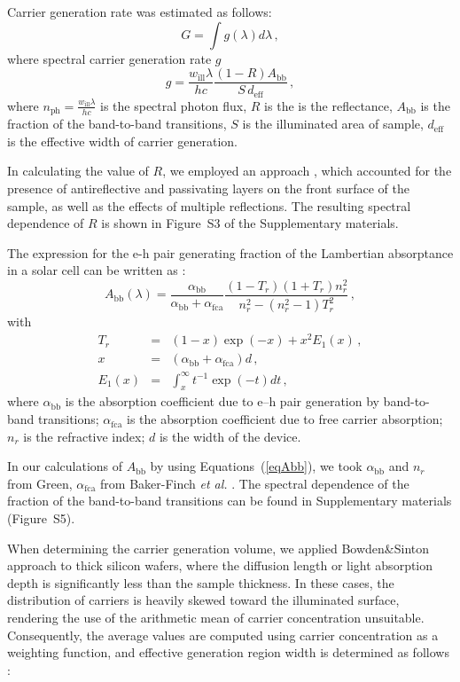 \documentclass{WileyMSP-template}
\begin{document}
Carrier generation rate was estimated as follows:
\begin{equation}
\label{eqGint}
G=\int g(\lambda) d\lambda\,,
\end{equation}
where spectral carrier generation rate $g$
\begin{equation}
\label{eqGspectr}
g=\frac{w_\mathrm{ill}\lambda}{hc}\frac{(1-R)A_\mathrm{bb}}{S\,d_\mathrm{eff}}\,,
\end{equation}
where $n_\mathrm{ph}=\frac{w_\mathrm{ill}\lambda}{hc}$ is the spectral photon flux,
$R$ is the is the reflectance,
$A_\mathrm{bb}$ is the fraction of the band-to-band transitions,
$S$ is the illuminated area of sample,
$d_\mathrm{eff}$ is the effective width of carrier generation.

In calculating the value of $R$, we employed an approach \cite{KostRefl2000},
which accounted for the presence of antireflective and passivating layers on the front surface of the sample,
as well as the effects of multiple reflections.
The resulting spectral dependence of $R$ is shown in Figure~S3 of the Supplementary materials.

The expression for the e-h pair generating fraction of the Lambertian absorptance in a solar cell
can be written as \cite{Schaefer2018}:
\begin{equation}
\label{eqAbb}
A_\mathrm{bb}(\lambda)=\frac{\alpha_\mathrm{bb}}{\alpha_\mathrm{bb}+\alpha_\mathrm{fca}}\frac{(1-T_r)(1+T_r)n_r^2}{n_r^2-(n_r^2-1)T_r^2}\,,
\end{equation}
with
\begin{eqnarray*}
T_r&=&(1-x)\exp(-x)+x^2E_1(x)\,,\\
x&=&(\alpha_\mathrm{bb}+\alpha_\mathrm{fca})d\,,\\
E_1(x)&=&\int_x^\infty t^{-1}\exp(-t)dt\,,
\end{eqnarray*}
where
$\alpha_\mathrm{bb}$ is the absorption coefficient due to e–h pair
generation by band-to-band transitions;
$\alpha_\mathrm{fca}$ is the absorption coefficient due to free carrier absorption;
$n_r$ is the refractive index;
$d$ is the width of the device.

In our calculations of $A_\mathrm{bb}$ by using Equations~(\ref{eqAbb}), we took  $\alpha_\mathrm{bb}$ and
$n_r$ from Green\cite{Green2022}, $\alpha_\mathrm{fca}$  from Baker-Finch \emph{et al.} \cite{SiFCA}.
The spectral dependence of the fraction of the band-to-band transitions can be found in Supplementary materials (Figure~S5).

When determining the carrier generation volume, we applied Bowden\&Sinton  approach \cite{Bowden2007} to thick silicon wafers,
where the diffusion length or light absorption depth is significantly less than the sample thickness.
In these cases, the distribution of carriers is heavily skewed toward the illuminated surface,
rendering the use of the arithmetic mean of carrier concentration unsuitable.
Consequently, the average values are computed using carrier concentration as a weighting function,
and effective generation region width is determined as follows \cite{Bowden2007}:
\end{document}
